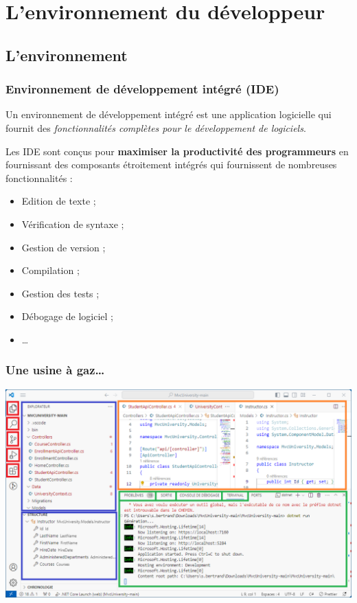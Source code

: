 \section{L'environnement du développeur}
\label{sec:environnement}

\subsection{L'environnement}
\label{subsec:environnement}

\begin{frame}
    \frametitle{Environnement de développement intégré (IDE)}

    Un environnement de développement intégré est une application logicielle
    qui fournit des \emph{fonctionnalités complètes pour le développement de logiciels}.

    Les IDE sont conçus pour \textbf{maximiser la productivité des programmeurs}
    en fournissant des composants étroitement intégrés qui fournissent de nombreuses fonctionnalités :
    \begin{itemize}
        \item Edition de texte ;
        \item Vérification de syntaxe ;
        \item Gestion de version ;
        \item Compilation ;
        \item Gestion des tests ;
        \item Débogage de logiciel ;
        \item \ldots
    \end{itemize}
\end{frame}

\begin{frame}
    \frametitle{Une usine à gaz\ldots}
    \centering
    \includegraphics[height=0.5\linewidth]{figures/environnement/vscode}
\end{frame}

